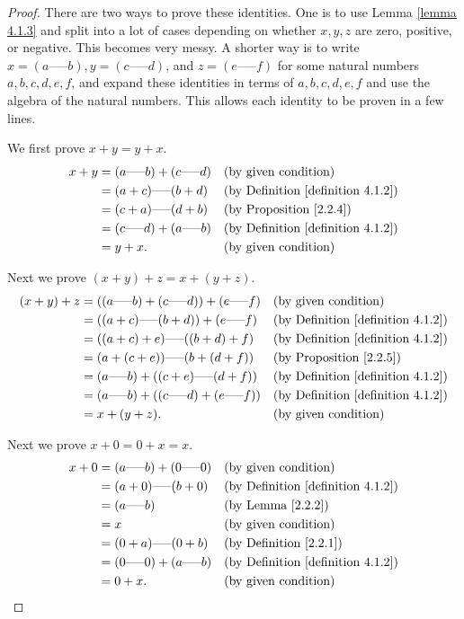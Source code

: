 \begin{proof}
There are two ways to prove these identities.
One is to use Lemma \ref{lemma 4.1.3} and split into a lot of cases depending on whether \(x, y, z\) are zero, positive, or negative.
This becomes very messy.
A shorter way is to write \(x = (a \text{-----} b), y = (c \text{-----} d)\), and \(z = (e \text{-----} f)\) for some natural numbers \(a, b, c, d, e, f\), and expand these identities in terms of \(a, b, c, d, e, f\) and use the algebra of the natural numbers.
This allows each identity to be proven in a few lines.

We first prove \(x + y = y + x\).
\begin{align*}
x + y &= (a \text{-----} b) + (c \text{-----} d) && \text{(by given condition)} \\
&= (a + c) \text{-----} (b + d) && \text{(by Definition \ref{definition 4.1.2})} \\
&= (c + a) \text{-----} (d + b) && \text{(by Proposition \ref{2.2.4})} \\
&= (c \text{-----} d) + (a \text{-----} b) && \text{(by Definition \ref{definition 4.1.2})} \\
&= y + x. && \text{(by given condition)}
\end{align*}

Next we prove \((x + y) + z = x + (y + z)\).
\begin{align*}
(x + y) + z &= ((a \text{-----} b) + (c \text{-----} d)) + (e \text{-----} f) && \text{(by given condition)} \\
&= ((a + c) \text{-----} (b + d)) + (e \text{-----} f) && \text{(by Definition \ref{definition 4.1.2})} \\
&= ((a + c) + e) \text{-----} ((b + d) + f) && \text{(by Definition \ref{definition 4.1.2})} \\
&= (a + (c + e)) \text{-----} (b + (d + f)) && \text{(by Proposition \ref{2.2.5})} \\
&= (a \text{-----} b) + ((c + e) \text{-----} (d + f)) && \text{(by Definition \ref{definition 4.1.2})} \\
&= (a \text{-----} b) + ((c \text{-----} d) + (e \text{-----} f)) && \text{(by Definition \ref{definition 4.1.2})} \\
&= x + (y + z). && \text{(by given condition)}
\end{align*}

Next we prove \(x + 0 = 0 + x = x\).
\begin{align*}
x + 0 &= (a \text{-----} b) + (0 \text{-----} 0) && \text{(by given condition)} \\
&= (a + 0) \text{-----} (b + 0) && \text{(by Definition \ref{definition 4.1.2})} \\
&= (a \text{-----} b) && \text{(by Lemma \ref{2.2.2})} \\
&= x && \text{(by given condition)} \\
&= (0 + a) \text{-----} (0 + b) && \text{(by Definition \ref{2.2.1})} \\
&= (0 \text{-----} 0) + (a \text{-----} b) && \text{(by Definition \ref{definition 4.1.2})} \\
&= 0 + x. && \text{(by given condition)}
\end{align*}


\end{proof}
